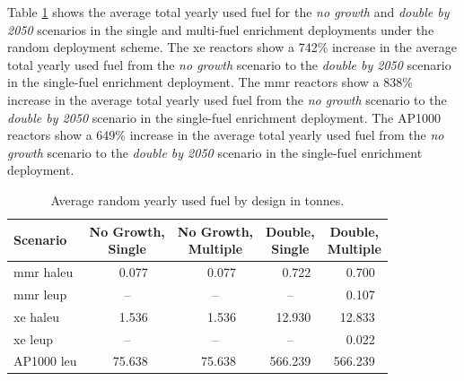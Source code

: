Table \ref{tab:random_used_avg} shows the average total yearly used fuel for the \textit{no growth} and \textit{double by 2050} scenarios in the single and multi-fuel enrichment deployments under the random deployment scheme. The \gls{xe} reactors show a 742\% increase in the average total yearly used fuel from the \textit{no growth} scenario to the \textit{double by 2050} scenario in the single-fuel enrichment deployment. The \gls{mmr} reactors show a 838\% increase in the average total yearly used fuel from the \textit{no growth} scenario to the \textit{double by 2050} scenario in the single-fuel enrichment deployment. The AP1000 reactors show a 649\% increase in the average total yearly used fuel from the \textit{no growth} scenario to the \textit{double by 2050} scenario in the single-fuel enrichment deployment.

\begin{table}[H]
    \centering
    \caption{Average random yearly used fuel by design in tonnes.}
    \label{tab:random_used_avg}
    \begin{tabular}{l c c c c}
       \toprule
       Scenario & \shortstack{No Growth,\\ Single} & \shortstack{No Growth,\\ Multiple} & \shortstack{Double,\\ Single} & \shortstack{Double,\\ Multiple}  \\
       \midrule
       \gls{mmr} \gls{haleu}   & \textcolor{white}{00}0.077    & \textcolor{white}{00}0.077   & \textcolor{white}{00}0.722    & \textcolor{white}{00}0.700    \\
       \gls{mmr} \gls{leup}    & --       & --      & --       & \textcolor{white}{00}0.107    \\
       \gls{xe} \gls{haleu}    & \textcolor{white}{00}1.536    & \textcolor{white}{00}1.536   & \textcolor{white}{0}12.930   & \textcolor{white}{0}12.833   \\
       \gls{xe} \gls{leup}     & --       & --      & --       & \textcolor{white}{00}0.022    \\
       AP1000 \gls{leu}        & \textcolor{white}{0}75.638   & \textcolor{white}{0}75.638  & 566.239  & 566.239  \\
       \bottomrule
    \end{tabular}
\end{table}

